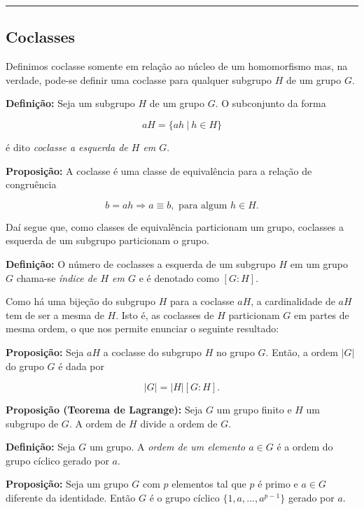 \documentclass[11pt]{article}
\begin{document}
\begin{center}\rule{0.5\linewidth}{0.5pt}\end{center}

\hypertarget{coclasses}{%
\subsection{Coclasses}\label{coclasses}}

Definimos coclasse somente em relação ao núcleo de um homomorfismo mas,
na verdade, pode-se definir uma coclasse para qualquer subgrupo \(H\) de
um grupo \(G\).

\textbf{Definição:} Seja um subgrupo \(H\) de um grupo \(G\). O
subconjunto da forma

\[aH = \{ah \ | \ h\in H\}\]

é dito \emph{coclasse a esquerda de \(H\) em \(G\)}.

\textbf{Proposição:} A coclasse é uma classe de equivalência para a
relação de congruência

\[b = ah \Rightarrow a \equiv b, \text{ para algum } h\in H.\]

Daí segue que, como classes de equivalência particionam um grupo,
coclasses a esquerda de um subgrupo particionam o grupo.

\textbf{Definição:} O número de coclasses a esquerda de um subgrupo
\(H\) em um grupo \(G\) chama-se \emph{índice de \(H\) em \(G\)} e é
denotado como \([G:H]\).

Como há uma bijeção do subgrupo \(H\) para a coclasse \(aH\), a
cardinalidade de \(aH\) tem de ser a mesma de \(H\). Isto é, as
coclasses de \(H\) particionam \(G\) em partes de mesma ordem, o que nos
permite enunciar o seguinte resultado:

\textbf{Proposição:} Seja \(aH\) a coclasse do subgrupo \(H\) no grupo
\(G\). Então, a ordem \(|G|\) do grupo \(G\) é dada por

\[|G| = |H|[G:H].\]

\textbf{Proposição (Teorema de Lagrange):} Seja \(G\) um grupo finito e
\(H\) um subgrupo de \(G\). A ordem de \(H\) divide a ordem de \(G\).

\textbf{Definição:} Seja \(G\) um grupo. A \emph{ordem de um elemento
\(a\in G\)} é a ordem do grupo cíclico gerado por \(a\).

\textbf{Proposição:} Seja um grupo \(G\) com \(p\) elementos tal que
\(p\) é primo e \(a\in G\) diferente da identidade. Então \(G\) é o
grupo cíclico \(\{1,a,\dots,a^{p-1}\}\) gerado por \(a\).
\end{document}
